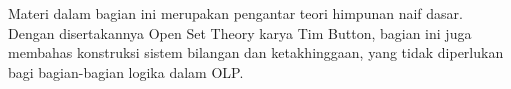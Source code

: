 \documentclass[../../include/open-logic-part]{subfiles}
\begin{document}

\begin{editorial}
  Materi dalam bagian ini merupakan pengantar teori himpunan naif dasar.
  Dengan disertakannya Open Set Theory karya Tim Button, bagian ini juga
  membahas konstruksi sistem bilangan dan ketakhinggaan, yang tidak diperlukan
  bagi bagian-bagian logika dalam OLP.
\end{editorial}







\OLEndPartHook
\end{document}
